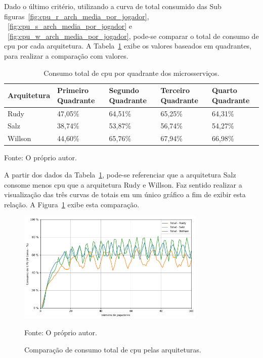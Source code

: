 Dado o último critério, utilizando a curva de total consumido das Sub figuras~\ref{fig:cpu_r_arch_media_por_jogador}, ~\ref{fig:cpu_s_arch_media_por_jogador} e ~\ref{fig:cpu_w_arch_media_por_jogador},  pode-se comparar o total de consumo de \ac{cpu} por cada arquitetura.
%
A Tabela~\ref{tab:consumo_total_cpu} exibe os valores baseados em quadrantes, para realizar a comparação com valores.


\begin{table}[htb!]
\centering
\begin{adjustbox}{max width=\textwidth}
\caption{Consumo total de \ac{cpu} por quadrante dos microsserviços.}
\label{tab:consumo_total_cpu}

\begin{tabular}{|l|l|l|l|l|}
\hline
Arquitetura & Primeiro Quadrante & Segundo Quadrante & Terceiro Quadrante & Quarto Quadrante \\ \hline
Rudy        & 47,05\%            & 64,51\%           & 65,25\%            & 64,31\%          \\ \hline
Salz        & 38,74\%            & 53,87\%           & 56,74\%            & 54,27\%          \\ \hline
Willson     & 44,60\%            & 65,76\%           & 67,94\%            & 66,98\%          \\ \hline
\end{tabular}
\end{adjustbox}

Fonte: O próprio autor.
\end{table}

A partir dos dados da Tabela~\ref{tab:consumo_total_cpu}, pode-se referenciar que a arquitetura Salz consome menos \ac{cpu} que a arquitetura Rudy e Willson.
%
Faz sentido realizar a visualização das três curvas de totais em um único gráfico a fim de exibir esta relação.
%
A Figura~\ref{fig:consumo_total_cpu} exibe esta comparação.

\begin{figure}[htb!]
  \caption{Comparação de consumo total de \ac{cpu} pelas arquiteturas.}
  \label{fig:consumo_total_cpu}
  \includegraphics[width=0.8\textwidth]{figuras/analise/cpu_total_archs.png}
  \centering

  Fonte: O próprio autor.
\end{figure}

